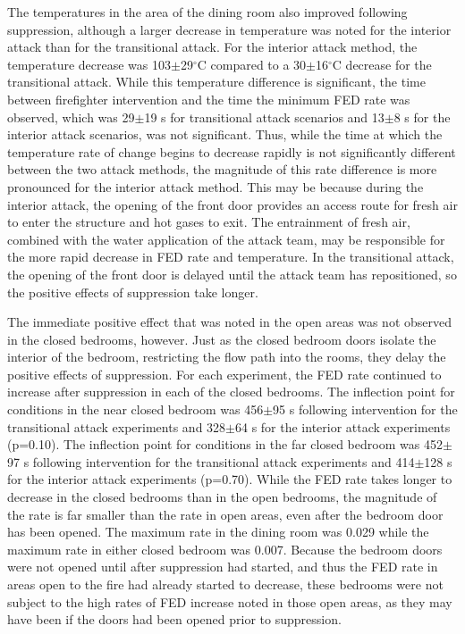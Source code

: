 \documentclass[12pt,oneside]{article}
\begin{document}
The temperatures in the area of the dining room also improved following suppression, although a larger decrease in temperature was noted for the interior attack than for the transitional attack. For the interior attack method, the temperature decrease was 103$\pm$29$^{\circ}$C compared to a 30$\pm$16$^{\circ}$C decrease for the transitional attack. While this temperature difference is significant, the time between firefighter intervention and the time the minimum FED rate was observed, which was 29$\pm$19 s for transitional attack scenarios and 13$\pm$8 s for the interior attack scenarios, was not significant. Thus, while the time at which the temperature rate of change begins to decrease rapidly is not significantly different between the two attack methods, the magnitude of this rate difference is more pronounced for the interior attack method. This may be because during the interior attack, the opening of the front door provides an access route for fresh air to enter the structure and hot gases to exit. The entrainment of fresh air, combined with the water application of the attack team, may be responsible for the more rapid decrease in FED rate and temperature. In the transitional attack, the opening of the front door is delayed until the attack team has repositioned, so the positive effects of suppression take longer.

The immediate positive effect that was noted in the open areas was not observed in the closed bedrooms, however. Just as the closed bedroom doors isolate the interior of the bedroom, restricting the flow path into the rooms, they delay the positive effects of suppression. For each experiment, the FED rate continued to increase after suppression in each of the closed bedrooms. The inflection point for conditions in the near closed bedroom was 456$\pm$95 s following intervention for the transitional attack experiments and 328$\pm$64 s for the interior attack experiments (p=0.10).  The inflection point for conditions in the far closed bedroom  was 452$\pm$97 s following intervention for the transitional attack experiments and 414$\pm$128 s for the interior attack experiments (p=0.70).  While the FED rate takes longer to decrease in the closed bedrooms than in the open bedrooms, the magnitude of the rate is far smaller than the rate in open areas, even after the bedroom door has been opened. The maximum rate in the dining room was 0.029 while the maximum rate in either closed bedroom was 0.007. Because the bedroom doors were not opened until after suppression had started, and thus the FED rate in areas open to the fire had already started to decrease, these bedrooms were not subject to the high rates of FED increase noted in those open areas, as they may have been if the doors had been opened prior to suppression. 
\end{document}
